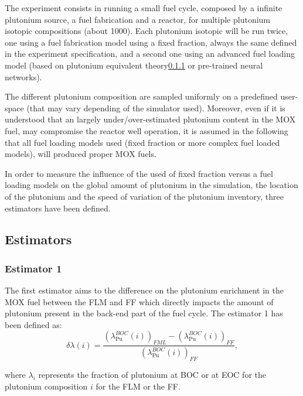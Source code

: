 The experiment consists in running a small fuel cycle, composed by a infinite
plutonium source, a fuel fabrication and a reactor, for multiple plutonium
isotopic compositions (about 1000). Each plutonium isotopic will be run twice,
one using a fuel fabrication model using a fixed fraction, always the same
defined in the experiment specification, and a second one using an advanced fuel
loading model (based on plutonium equivalent theory\ref{} or pre-trained neural
networks).

The different plutonium composition are sampled uniformly on a predefined
user-space (that may vary depending of the simulator used). Moreover, even if
it is understood that an largely under/over-estimated plutonium content in the
MOX fuel, may compromise the reactor well operation, it is assumed in the
following that all fuel loading models used (fixed fraction or more complex fuel
loaded models), will produced proper MOX fuels.

In order to measure the influence of the used of fixed fraction versus a fuel
loading models on the global amount of plutonium in the simulation, the location
of the plutonium and the speed of variation of the plutonium inventory, three
estimators have been defined.

\subsection{Estimators}
\subsubsection{Estimator 1}
The first estimator aims to the difference on the plutonium enrichment in the MOX
fuel between the \gls{FLM} and \gls{FF} which directly impacts the amount of
plutonium present in the back-end part of the fuel cycle. The estimator 1 has
been defined as:
\begin{equation}
    \delta{\lambda}(i) =
        \frac{\left(\lambda_{\mathrm{Pu}}^{BOC}(i)\right)_{FML}
              - \left(\lambda_{\mathrm{Pu}}^{BOC}(i)\right)_{FF}}
              {\left(\lambda_{\mathrm{Pu}}^{BOC}(i)\right)_{FF}},
\end{equation}

where $\lambda_i$ represents the fraction of plutonium at \gls{BOC} or at
\gls{EOC} for the plutonium composition $i$ for the \gls{FLM} or the \gls{FF}.

